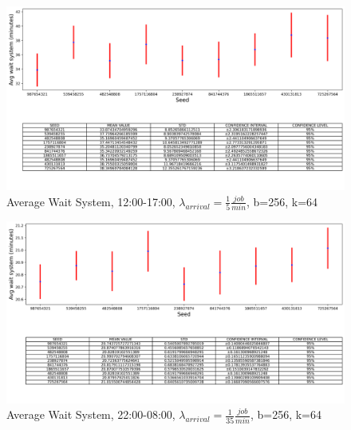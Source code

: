 \documentclass{article}
\begin{document}
\begin{figure}[H]
	\centering
	\captionsetup{justification=centering,margin=2cm}
	\includegraphics[scale=0.48]{images/avg_ws_steady_state_aft.png}
	\caption{Average Wait System, 12:00-17:00, $\lambda_{arrival}=\frac{1}{5} \frac{job}{min}$, b=256, k=64}\label{figura:avg_ws_steady_state_eve}
\end{figure}

\begin{figure}[H]
	\centering
	\captionsetup{justification=centering,margin=2cm}
	\includegraphics[scale=0.48]{images/avg_ws_steady_state_night.png}
	\caption{Average Wait System, 22:00-08:00, $\lambda_{arrival}=\frac{1}{35} \frac{job}{min}$, b=256, k=64}\label{figura:avg_ws_steady_state_night}
\end{figure}
\end{document}

